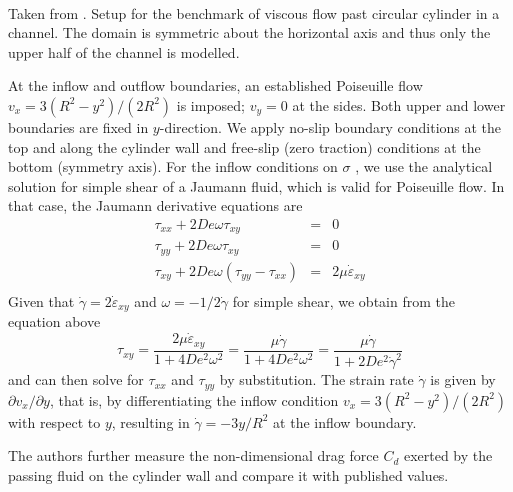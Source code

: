 \begin{center}
\\
{\captionfont Taken from \textcite{bepo10}.
Setup for the benchmark of viscous flow past circular cylinder in a channel. 
The domain is symmetric about the horizontal axis and thus only the
upper half of the channel is modelled.
}
\end{center}


At the inflow and outflow boundaries, an established Poiseuille flow 
$v_x = 3(R^2 -y^2 )/(2R^2)$ is imposed; $v_y=0$ at
the sides. Both upper and lower boundaries are fixed in $y$-direction. We apply no-slip boundary conditions at the top and along the cylinder
wall and free-slip (zero traction) conditions at the bottom (symmetry axis). For the inflow conditions on $\sigma$ , we use the analytical solution for
simple shear of a Jaumann fluid, which is valid for Poiseuille flow. In that case, the Jaumann derivative equations are
\begin{eqnarray}
\tau_{xx}+2 De \omega \tau_{xy} &=& 0 \\
\tau_{yy}+2 De \omega \tau_{xy} &=& 0 \\
\tau_{xy}+2 De \omega (\tau_{yy}-\tau_{xx}) &=& 2 \mu \dot{\varepsilon}_{xy} \\
\end{eqnarray}
Given that $\dot\gamma = 2\dot\varepsilon_{xy}$ and $\omega = -1/2 \dot\gamma$ for simple shear, we obtain from the equation above
\[
\tau_{xy} = \frac{2 \mu \dot\varepsilon_{xy}}{1+4De^2\omega^2}
= \frac{\mu \dot\gamma}{1+4De^2\omega^2}
=\frac{\mu \dot\gamma}{1+2 De^2 \dot{\gamma}^2}
\]
and can then solve for $\tau_{xx}$ and $\tau_{yy}$ by substitution.
The strain rate $\dot\gamma$ is given by $\partial v_x /\partial y$, 
that is, by differentiating the inflow
condition $v_x = 3(R^2 -y^2 )/(2R^2)$ 
with respect to $y$, resulting in $\dot\gamma= -3y/R^2$ at the inflow boundary.

The authors further measure the non-dimensional drag force $C_d$ exerted by the passing fluid on the cylinder wall and compare it with published values.



